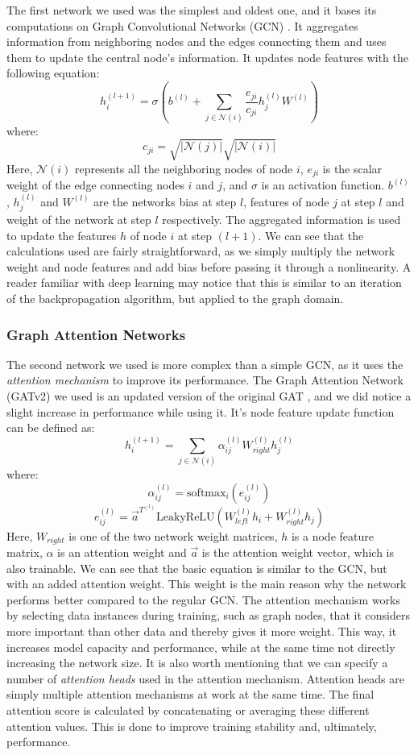 \documentclass[times, utf8, diplomski, english]{fer_eng}
\begin{document}
The first network we used was the simplest and oldest one, and it bases its computations on Graph Convolutional Networks (GCN) \cite{GCN}. It aggregates information from neighboring nodes and the edges connecting them and uses them to update the central node's information. It updates node features with the following equation:
\[ h_i^{(l+1)} = \sigma \left(b^{(l)} + \sum_{j \in \mathcal{N}(i)} \frac{e_{ji}}{c_{ji}} h_j^{(l)} W^{(l)} \right) \]
where:
\[ c_{ji} = \sqrt{|\mathcal{N}(j)|} \sqrt{|\mathcal{N}(i)|} \]
Here, $\mathcal{N}(i)$ represents all the neighboring nodes of node $i$, $e_{ji}$ is the scalar weight of the edge connecting nodes $i$ and $j$, and $\sigma$ is an activation function. $b^{(l)}$, $h_j^{(l)}$ and $W^{(l)}$ are the networks bias at step $l$, features of node $j$ at step $l$ and weight of the network at step $l$ respectively. The aggregated information is used to update the features $h$ of node $i$ at step $(l+1)$. We can see that the calculations used are fairly straightforward, as we simply multiply the network weight and node features and add bias before passing it through a nonlinearity. A reader familiar with deep learning may notice that this is similar to an iteration of the backpropagation algorithm, but applied to the graph domain.

\subsubsection{Graph Attention Networks}
\label{subsubsec:graph attention networks}

The second network we used is more complex than a simple GCN, as it uses the \textit{attention mechanism} \cite{attention} to improve its performance. The Graph Attention Network (GATv2) \cite{GATv2} we used is an updated version of the original GAT \cite{GAT}, and we did notice a slight increase in performance while using it. It's node feature update function can be defined as:
\[ h_i^{(l+1)} = \sum_{j \in \mathcal{N}(i)} \alpha_{ij}^{(l)} W_{right}^{(l)} h_j^{(l)} \]
where:
\[ \alpha_{ij}^{(l)} = \mathrm{softmax}_i (e_{ij}^{(l)}) \]
\[ e_{ij}^{(l)} = \vec{a}^{T^{(l)}} \mathrm{LeakyReLU} (W_{left}^{(l)} h_i + W_{right}^{(l)} h_j) \]
Here, $W_{right}$ is one of the two network weight matrices, $h$ is a node feature matrix, $\alpha$ is an attention weight and $\vec{a}$ is the attention weight vector, which is also trainable. We can see that the basic equation is similar to the GCN, but with an added attention weight. This weight is the main reason why the network performs better compared to the regular GCN. The attention mechanism works by selecting data instances during training, such as graph nodes, that it considers more important than other data and thereby gives it more weight. This way, it increases model capacity and performance, while at the same time not directly increasing the network size. It is also worth mentioning that we can specify a number of \textit{attention heads} used in the attention mechanism. Attention heads are simply multiple attention mechanisms at work at the same time. The final attention score is calculated by concatenating or averaging these different attention values. This is done to improve training stability and, ultimately, performance.
\end{document}

